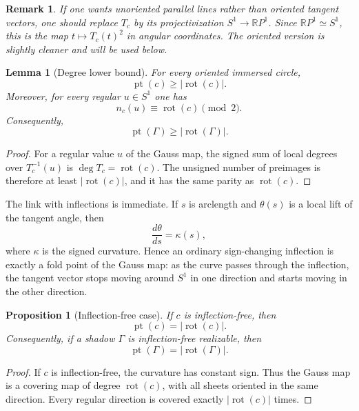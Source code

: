 \documentclass[11pt]{article}
\newtheorem{proposition}[theorem]{Proposition}
\newtheorem{remark}[theorem]{Remark}
\newtheorem{lemma}[theorem]{Lemma}
\newcommand{\rot}{\operatorname{rot}}
\newcommand{\parnum}{\operatorname{pt}}
\begin{document}
\begin{remark}
If one wants unoriented parallel lines rather than oriented tangent vectors, one should replace $T_c$ by its projectivization $S^1\to\mathbb RP^1$.  Since $\mathbb RP^1\simeq S^1$, this is the map $t\mapsto T_c(t)^2$ in angular coordinates.  The oriented version is slightly cleaner and will be used below.
\end{remark}

\begin{lemma}[Degree lower bound]\label{lem:paralleldegree}
For every oriented immersed circle,
\[
 \parnum(c)\ge |\rot(c)|.
\]
Moreover, for every regular $u\in S^1$ one has
\[
 n_c(u)\equiv \rot(c)\pmod 2.
\]
Consequently,
\[
 \parnum(\Gamma)\ge |\rot(\Gamma)|.
\]
\end{lemma}

\begin{proof}
For a regular value $u$ of the Gauss map, the signed sum of local degrees over $T_c^{-1}(u)$ is $\deg T_c=\rot(c)$.  The unsigned number of preimages is therefore at least $|\rot(c)|$, and it has the same parity as $\rot(c)$.
\end{proof}

The link with inflections is immediate.  If $s$ is arclength and $\theta(s)$ is a local lift of the tangent angle, then
\[
 \frac{d\theta}{ds}=\kappa(s),
\]
where $\kappa$ is the signed curvature.  Hence an ordinary sign-changing inflection is exactly a fold point of the Gauss map: as the curve passes through the inflection, the tangent vector stops moving around $S^1$ in one direction and starts moving in the other direction.

\begin{proposition}[Inflection-free case]\label{prop:parallelconvex}
If $c$ is inflection-free, then
\[
 \parnum(c)=|\rot(c)|.
\]
Consequently, if a shadow $\Gamma$ is inflection-free realizable, then
\[
 \parnum(\Gamma)=|\rot(\Gamma)|.
\]
\end{proposition}

\begin{proof}
If $c$ is inflection-free, the curvature has constant sign.  Thus the Gauss map is a covering map of degree $\rot(c)$, with all sheets oriented in the same direction.  Every regular direction is covered exactly $|\rot(c)|$ times.
\end{proof}
\end{document}
